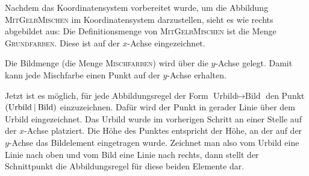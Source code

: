 \documentclass[../../main.tex]{subfiles}
\begin{document}
\begin{example}
    Nachdem das Koordinatensystem vorbereitet wurde, um die Abbildung \textsc{MitGelbMischen} im Koordinatensystem darzustellen, sieht es wie rechts abgebildet aus: Die Definitionsmenge von \textsc{MitGelbMischen} ist die Menge \textsc{Grundfarben}. Diese ist auf der $x$-Achse eingezeichnet.
    
    Die Bildmenge (die Menge \textsc{Mischfarben}) wird über die $y$-Achse gelegt. Damit kann jede Mischfarbe einen Punkt auf der $y$-Achse erhalten.
\end{example}

Jetzt ist es möglich, für jede Abbildungsregel der Form $\text{Urbild}\mapsto\text{Bild}$ den Punkt $\left(\text{Urbild} \:\middle|\: \text{Bild}\right)$ einzuzeichnen. Dafür wird der Punkt in gerader Linie über dem Urbild eingezeichnet. Das Urbild wurde im vorherigen Schritt an einer Stelle auf der $x$-Achse platziert. Die Höhe des Punktes entspricht der Höhe, an der auf der $y$-Achse das Bildelement eingetragen wurde. Zeichnet man also vom Urbild eine Linie nach oben und vom Bild eine Linie nach rechts, dann stellt der Schnittpunkt die Abbildungsregel für diese beiden Elemente dar.
\end{document}

